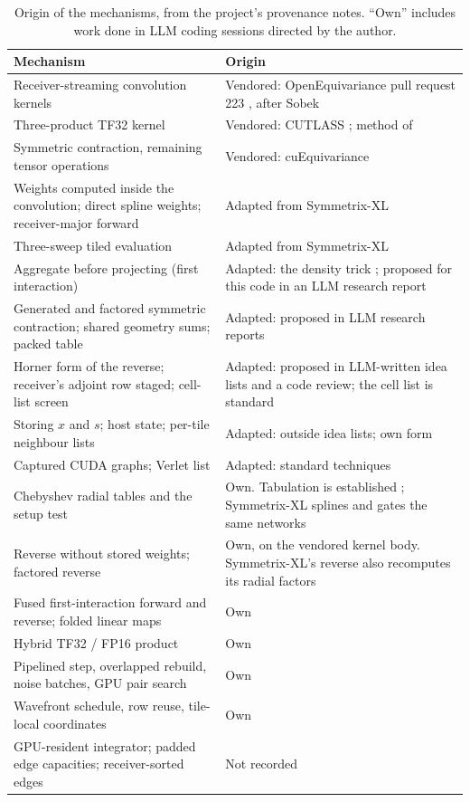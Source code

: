 \documentclass[11pt]{article}
\begin{document}
\begin{table}[H]
\centering
\small
\renewcommand{\arraystretch}{1.15}
\begin{tabularx}{\textwidth}{>{\raggedright\arraybackslash}p{6.0cm}Y}
\toprule
Mechanism & Origin \\
\midrule
Receiver-streaming convolution kernels & Vendored: OpenEquivariance pull request 223 \cite{fuchs2026oeqpr223}, after Sobek \cite{chorosajev2026sobek} \\
Three-product TF32 kernel & Vendored: CUTLASS \cite{cutlass}; method of \cite{ootomo2022tf32} \\
Symmetric contraction, remaining tensor operations & Vendored: cuEquivariance \cite{cuequivariance} \\
\midrule
Weights computed inside the convolution; direct spline weights; receiver-major forward & Adapted from Symmetrix-XL \cite{fu2026symmetrixxl} \\
Three-sweep tiled evaluation & Adapted from Symmetrix-XL \cite{fu2026symmetrixxl} \\
Aggregate before projecting (first interaction) & Adapted: the density trick \cite{drautz2019ace}; proposed for this code in an LLM research report \\
Generated and factored symmetric contraction; shared geometry sums; packed table & Adapted: proposed in LLM research reports \\
Horner form of the reverse; receiver's adjoint row staged; cell-list screen & Adapted: proposed in LLM-written idea lists and a code review; the cell list is standard \\
Storing $x$ and $s$; host state; per-tile neighbour lists & Adapted: outside idea lists; own form \\
Captured CUDA graphs; Verlet list & Adapted: standard techniques \cite{cudagraphs,verlet1967} \\
\midrule
Chebyshev radial tables and the setup test & Own. Tabulation is established \cite{lu2022dpcompress}; Symmetrix-XL splines and gates the same networks \cite{fu2026symmetrixxl} \\
Reverse without stored weights; factored reverse & Own, on the vendored kernel body. Symmetrix-XL's reverse also recomputes its radial factors \cite{fu2026symmetrixxl} \\
Fused first-interaction forward and reverse; folded linear maps & Own \\
Hybrid TF32 / FP16 product & Own \\
Pipelined step, overlapped rebuild, noise batches, GPU pair search & Own \\
Wavefront schedule, row reuse, tile-local coordinates & Own \\
\midrule
GPU-resident integrator; padded edge capacities; receiver-sorted edges & Not recorded \\
\bottomrule
\end{tabularx}
\caption{Origin of the mechanisms, from the project's provenance notes. ``Own'' includes work done in LLM coding
sessions directed by the author.}
\label{tab:origins}
\end{table}
\end{document}
